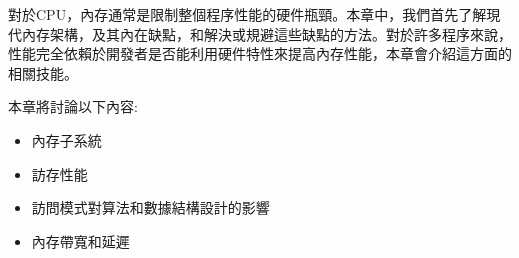 對於CPU，內存通常是限制整個程序性能的硬件瓶頸。本章中，我們首先了解現代內存架構，及其內在缺點，和解決或規避這些缺點的方法。對於許多程序來說，性能完全依賴於開發者是否能利用硬件特性來提高內存性能，本章會介紹這方面的相關技能。

本章將討論以下內容:

\begin{itemize}
\item 內存子系統
\item 訪存性能
\item 訪問模式對算法和數據結構設計的影響
\item 內存帶寬和延遲
\end{itemize}
























